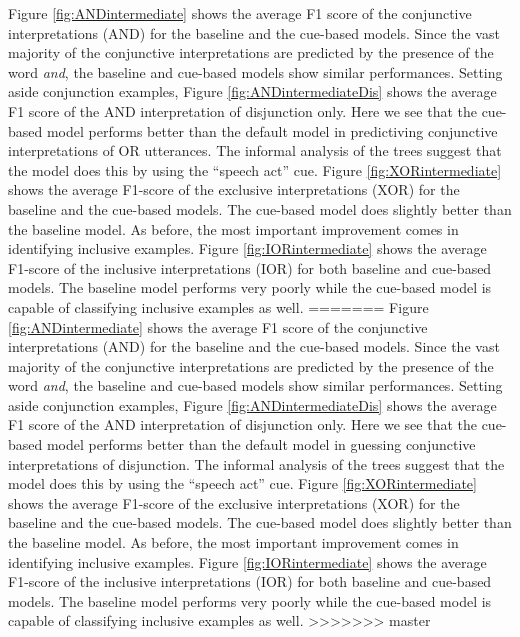 \documentclass[,man,floatsintext]{apa6}
\begin{document}
Figure \ref{fig:ANDintermediate} shows the average F1 score of the conjunctive interpretations (AND) for the baseline and the cue-based models. Since the vast majority of the conjunctive interpretations are predicted by the presence of the word \emph{and}, the baseline and cue-based models show similar performances. Setting aside conjunction examples, Figure \ref{fig:ANDintermediateDis} shows the average F1 score of the AND interpretation of disjunction only. Here we see that the cue-based model performs better than the default model in predictiving conjunctive interpretations of OR utterances. The informal analysis of the trees suggest that the model does this by using the \enquote{speech act} cue. Figure \ref{fig:XORintermediate} shows the average F1-score of the exclusive interpretations (XOR) for the baseline and the cue-based models. The cue-based model does slightly better than the baseline model. As before, the most important improvement comes in identifying inclusive examples. Figure \ref{fig:IORintermediate} shows the average F1-score of the inclusive interpretations (IOR) for both baseline and cue-based models. The baseline model performs very poorly while the cue-based model is capable of classifying inclusive examples as well.
=======
Figure \ref{fig:ANDintermediate} shows the average F1 score of the conjunctive interpretations (AND) for the baseline and the cue-based models. Since the vast majority of the conjunctive interpretations are predicted by the presence of the word \emph{and}, the baseline and cue-based models show similar performances. Setting aside conjunction examples, Figure \ref{fig:ANDintermediateDis} shows the average F1 score of the AND interpretation of disjunction only. Here we see that the cue-based model performs better than the default model in guessing conjunctive interpretations of disjunction. The informal analysis of the trees suggest that the model does this by using the \enquote{speech act} cue. Figure \ref{fig:XORintermediate} shows the average F1-score of the exclusive interpretations (XOR) for the baseline and the cue-based models. The cue-based model does slightly better than the baseline model. As before, the most important improvement comes in identifying inclusive examples. Figure \ref{fig:IORintermediate} shows the average F1-score of the inclusive interpretations (IOR) for both baseline and cue-based models. The baseline model performs very poorly while the cue-based model is capable of classifying inclusive examples as well.
>>>>>>> master
\end{document}
